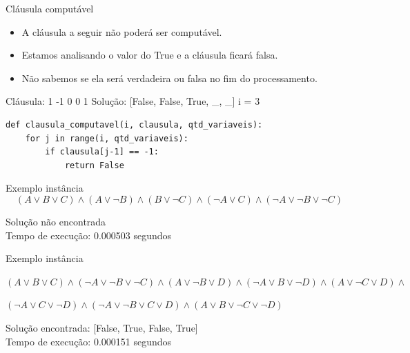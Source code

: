 \documentclass[compress,aspectratio=169]{beamer}
\begin{document}
    \begin{frame}[fragile]{Cláusula computável}
        \begin{itemize}
            \item A cláusula a seguir não poderá ser computável.
            \item Estamos analisando o valor do True e a cláusula ficará falsa.
            \item Não sabemos se ela será verdadeira ou falsa no fim do processamento.
        \end{itemize}
        \begin{tcolorbox}[width=\linewidth, fontupper=\ttfamily,  halign=flush left]
            Cláusula: 1 -1 0 0 1 \newline 
            Solução: [False, False, True, \_, \_] \newline
            i = 3
        \end{tcolorbox}
        \begin{lstlisting}
def clausula_computavel(i, clausula, qtd_variaveis):  
    for j in range(i, qtd_variaveis):
        if clausula[j-1] == -1:
            return False
        \end{lstlisting}
    \end{frame}


    \begin{frame}{Exemplo instância}
        \[(A \lor B \lor C) \land (A \lor \neg B) \land (B \lor \neg C) \land (\neg A \lor C) \land (\neg A \lor \neg B \lor \neg C)\]
        
        \begin{tcolorbox}[title=Saída da instância, width=\linewidth, fontupper=\ttfamily, halign=flush left]
            Solução não encontrada \\
            Tempo de execução: 0.000503 segundos \\  
        \end{tcolorbox}
    \end{frame}
    \begin{frame}{Exemplo instância}
        \begin{center}
            \((A \lor B \lor C) \land (\neg A \lor \neg B \lor \neg C) \land (A \lor \neg B \lor D) \land (\neg A \lor B \lor \neg D) \land (A \lor \neg C \lor D) \land \)

            \((\neg A \lor C \lor \neg D) \land (\neg A \lor \neg B \lor C \lor D) \land (A \lor B \lor \neg C \lor \neg D)\)
            
        \end{center}
        
        \begin{tcolorbox}[title=Saída da instância, width=\linewidth, fontupper=\ttfamily, halign=flush left]
            Solução encontrada: [False, True, False, True] \\
            Tempo de execução: 0.000151 segundos
        \end{tcolorbox}
    \end{frame}
\end{document}
